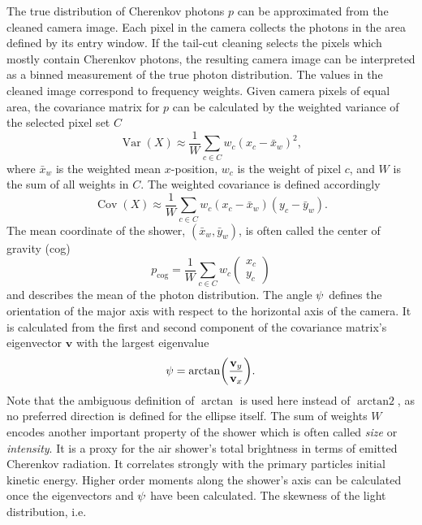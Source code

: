 The true distribution of Cherenkov photons $p$ can be approximated from the cleaned camera image.
Each pixel in the camera collects the photons in the area defined by its entry window. 
If the tail-cut cleaning selects the pixels which mostly contain Cherenkov photons, 
the resulting camera image can be interpreted as a binned measurement of the true photon distribution. 
The values in the cleaned image correspond to frequency weights. 
Given camera pixels of equal area, the covariance matrix for $p$ can be calculated by the weighted variance of the selected pixel set $C$
\begin{equation*}
    \operatorname{Var}(X) \approx \frac{1}{W} \sum_{c \in C} w_c (x_c - \bar{x}_w)^2,
\end{equation*}
where $\bar{x}_w$ is the weighted mean $x$-position, $w_c$ is the weight of pixel $c$, and $W$ is the sum of all weights in $C$.
The weighted covariance is defined accordingly
\begin{equation*}
    \operatorname{Cov}(X) \approx \frac{1}{W} \sum_{c \in C} w_c (x_c - \bar{x}_w) (y_c - \bar{y}_w).
\end{equation*}
The mean coordinate of the shower, $(\bar{x}_w, \bar{y}_w)$, is often called the center of gravity (cog)
\begin{equation*}
    p_{\text{cog}} = \frac{1}{W} \sum_{c \in C} w_c \begin{pmatrix}
        x_c \\
        y_c
    \end{pmatrix}
\end{equation*}
and describes the mean of the photon distribution.
The angle $\psi$ defines the orientation of the major axis with respect to the horizontal axis of the camera.
It is calculated from the first and second component of the covariance matrix's eigenvector $\mathbf{v}$ with the largest eigenvalue 
\begin{equation*}
    \imagerot = \operatorname{arctan}\left( \frac{\mathbf{v}_y}{\mathbf{v}_x} \right).
\end{equation*}
Note that the ambiguous definition of $\operatorname{arctan}$ is used here instead of $\operatorname{arctan2}$, as no preferred direction is defined 
for the ellipse itself. 
The sum of weights $W$ encodes another important property of the shower which is often called \emph{size} or \emph{intensity}.
It is a proxy for the air shower's total brightness in terms of emitted Cherenkov radiation. It correlates strongly with the primary particles initial kinetic energy. 
Higher order moments along the shower's axis can be calculated once the eigenvectors and $\psi$ have been calculated. The skewness of the light distribution, i.e. 
